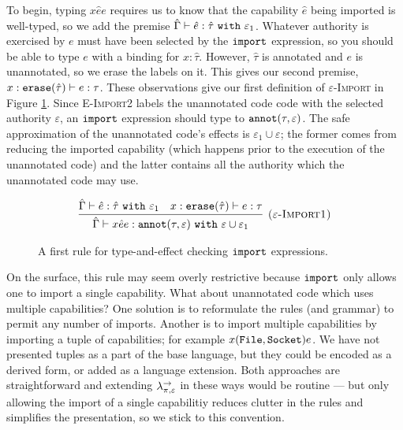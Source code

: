 To begin, typing ${x}{\hat e}{e}$ requires us to know that the capability $\hat e$ being imported is well-typed, so we add the premise $\hat \Gamma \vdash \hat e: \hat \tau~\mathtt{with}~ \varepsilon_1$. Whatever authority is exercised by $e$ must have been selected by the $\mathtt{import}$ expression, so you should be able to type $e$ with a binding for $x: \hat \tau$. However, $\hat \tau$ is annotated and $e$ is unannotated, so we erase the labels on it. This gives our second premise, $x: \mathtt{erase}(\hat \tau) \vdash e: \tau$. These observations give our first definition of \textsc{$\varepsilon$-Import} in Figure \ref{fig:import_rule_1}. Since \textsc{E-Import2} labels the unannotated code code with the selected authority $\varepsilon$, an $\mathtt{import}$ expression should type to $\mathtt{annot}(\tau, \varepsilon)$. The safe approximation of the unannotated code's effects is $\varepsilon_1 \cup \varepsilon$; the former comes from reducing the imported capability (which happens prior to the execution of the unannotated code) and the latter contains all the authority which the unannotated code may use.

\begin{figure}[h]

\fbox{$\tau <: \tau$}

\[
\begin{array}{c}

\infer[\textsc{($\varepsilon$-Import1)}]
	{ \hat \Gamma \vdash {x}{\hat e}{e}: \kwa{annot}(\tau, \varepsilon)~\kw{with} \varepsilon \cup \varepsilon_1 }
	{ \hat \Gamma \vdash \hat e: \hat \tau~\kw{with} \varepsilon_1 & x: \kwa{erase}(\hat \tau) \vdash e: \tau }

\end{array}
\]
\vspace{-7pt}
\caption{A first rule for type-and-effect checking $\mathtt{import}$ expressions.}
\label{fig:import_rule_1}
\end{figure}

On the surface, this rule may seem overly restrictive because $\mathtt{import}$ only allows one to import a single capability. What about unannotated code which uses multiple capabilities? One solution is to reformulate the rules (and grammar) to permit any number of imports. Another is to import multiple capabilities by importing a tuple of capabilities; for example ${x}{(\mathtt{File, Socket})}{e}$. We have not presented tuples as a part of the base language, but they could be encoded as a derived form, or added as a language extension. Both approaches are straightforward and extending $\lambda^{\rightarrow}_{\pi, \varepsilon}$ in these ways would be routine --- but only allowing the import of a single capabilitiy reduces clutter in the rules and simplifies the presentation, so we stick to this convention.

